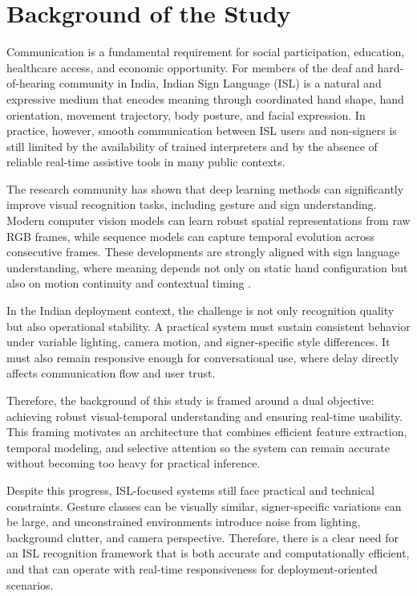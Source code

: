 \section{Background of the Study}
Communication is a fundamental requirement for social participation, education, healthcare access, and economic opportunity. For members of the deaf and hard-of-hearing community in India, Indian Sign Language (ISL) is a natural and expressive medium that encodes meaning through coordinated hand shape, hand orientation, movement trajectory, body posture, and facial expression. In practice, however, smooth communication between ISL users and non-signers is still limited by the availability of trained interpreters and by the absence of reliable real-time assistive tools in many public contexts.

The research community has shown that deep learning methods can significantly improve visual recognition tasks, including gesture and sign understanding. Modern computer vision models can learn robust spatial representations from raw RGB frames, while sequence models can capture temporal evolution across consecutive frames. These developments are strongly aligned with sign language understanding, where meaning depends not only on static hand configuration but also on motion continuity and contextual timing \cite{lecun2015deep,camgoz2018neural,joze2019msasl}.

In the Indian deployment context, the challenge is not only recognition quality but also operational stability. A practical system must sustain consistent behavior under variable lighting, camera motion, and signer-specific style differences. It must also remain responsive enough for conversational use, where delay directly affects communication flow and user trust.

Therefore, the background of this study is framed around a dual objective: achieving robust visual-temporal understanding and ensuring real-time usability. This framing motivates an architecture that combines efficient feature extraction, temporal modeling, and selective attention so the system can remain accurate without becoming too heavy for practical inference.

Despite this progress, ISL-focused systems still face practical and technical constraints. Gesture classes can be visually similar, signer-specific variations can be large, and unconstrained environments introduce noise from lighting, background clutter, and camera perspective. Therefore, there is a clear need for an ISL recognition framework that is both accurate and computationally efficient, and that can operate with real-time responsiveness for deployment-oriented scenarios.
